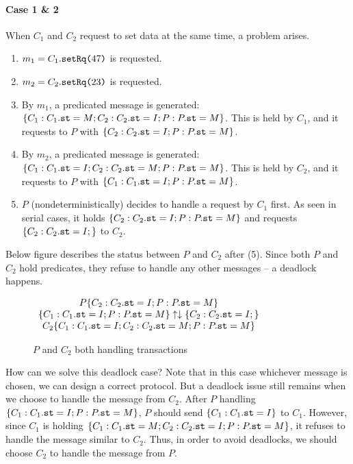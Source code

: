 \documentclass[format=manuscript]{acmart}
\begin{document}
\paragraph{Case 1 \& 2}\label{concurrent-case12}
When $C_1$ and $C_2$ request to set data at the same time, a problem arises.

\begin{enumerate}
\item $m_1 = C_1.\texttt{setRq(}47\texttt{)}$ is requested.
\item $m_2 = C_2.\texttt{setRq(}23\texttt{)}$ is requested.
\item By $m_1$, a predicated message is generated: $\{ C_1: C_1.\texttt{st} = M; C_2:
  C_2.\texttt{st} = I; P: P.\texttt{st} = M \}$. This is held by $C_1$, and it requests to
  $P$ with $\{ C_2: C_2.\texttt{st} = I; P: P.\texttt{st} = M \}$.
\item By $m_2$, a predicated message is generated: $\{ C_1: C_1.\texttt{st} = I; C_2:
  C_2.\texttt{st} = M; P: P.\texttt{st} = M \}$. This is held by $C_2$, and it requests to
  $P$ with $\{ C_1: C_1.\texttt{st} = I; P: P.\texttt{st} = M \}$.
\item $P$ (nondeterministically) decides to handle a request by $C_1$ first. As
  seen in serial cases, it holds $\{ C_2: C_2.\texttt{st} = I; P: P.\texttt{st} = M \}$
  and requests $\{ C_2: C_2.\texttt{st} = I; \}$ to $C_2$.
\end{enumerate}

Below figure describes the status between $P$ and $C_2$ after (5). Since both
$P$ and $C_2$ hold predicates, they refuse to handle any other messages -- a
deadlock happens.

\begin{figure}[h]
  \begin{math}
    \begin{array}{c}
      P \{ C_2: C_2.\texttt{st} = I; P: P.\texttt{st} = M \} \\
      \{ C_1: C_1.\texttt{st} = I; P: P.\texttt{st} = M \} \uparrow
      \downarrow \{ C_2: C_2.\texttt{st} = I; \} \\
      C_2 \{ C_1: C_1.\texttt{st} = I; C_2: C_2.\texttt{st} = M; P: P.\texttt{st} = M \}
    \end{array}
  \end{math}
  \caption{$P$ and $C_2$ both handling transactions}
\end{figure}

How can we solve this deadlock case? Note that in this case whichever message is
chosen, we can design a correct protocol. But a deadlock issue still remains
when we choose to handle the message from $C_2$. After $P$ handling $\{ C_1:
C_1.\texttt{st} = I; P: P.\texttt{st} = M \}$, $P$ should send $\{ C_1: C_1.\texttt{st} = I \}$
to $C_1$. However, since $C_1$ is holding $\{ C_1: C_1.\texttt{st} = M; C_2:
C_2.\texttt{st} = I; P: P.\texttt{st} = M \}$, it refuses to handle the message similar to
$C_2$. Thus, in order to avoid deadlocks, we should choose $C_2$ to handle the
message from $P$.
\end{document}
